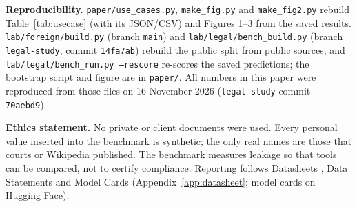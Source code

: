 \documentclass[10pt,twocolumn]{article}
\begin{document}
\textbf{Reproducibility.} \texttt{paper/use\_cases.py}, \texttt{make\_fig.py} and \texttt{make\_fig2.py} rebuild Table~\ref{tab:usecase} (with its JSON/CSV) and Figures 1--3 from the saved results. \texttt{lab/foreign/build.py} (branch \texttt{main}) and
\texttt{lab/legal/bench\_build.py} (branch \texttt{legal-study}, commit \texttt{14fa7ab}) rebuild the public split from
public sources, and \texttt{lab/legal/bench\_run.py --rescore} re-scores the saved predictions; the bootstrap script and figure are
in \texttt{paper/}. All numbers in this paper were reproduced from those files on 16 November 2026 (\texttt{legal-study} commit \texttt{70aebd9}).

\textbf{Ethics statement.} No private or client documents were used. Every personal value inserted into the
benchmark is synthetic; the only real names are those that courts or Wikipedia published. The benchmark
measures leakage so that tools can be compared, not to certify compliance. Reporting follows Datasheets
\citep{gebru2021datasheets}, Data Statements \citep{bender2018datastatements} and Model Cards
\citep{mitchell2019modelcards} (Appendix~\ref{app:datasheet}; model cards on Hugging Face).

\small



\normalsize
\appendix
\end{document}
